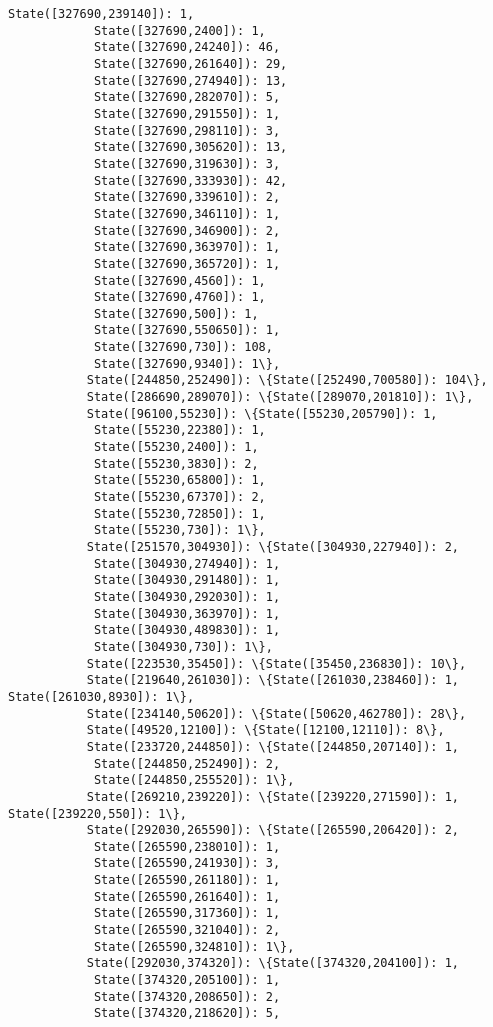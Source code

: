 \documentclass[11pt]{article}
\begin{document}
\begin{Verbatim}[commandchars=\\\{\}]
            State([327690,239140]): 1,
            State([327690,2400]): 1,
            State([327690,24240]): 46,
            State([327690,261640]): 29,
            State([327690,274940]): 13,
            State([327690,282070]): 5,
            State([327690,291550]): 1,
            State([327690,298110]): 3,
            State([327690,305620]): 13,
            State([327690,319630]): 3,
            State([327690,333930]): 42,
            State([327690,339610]): 2,
            State([327690,346110]): 1,
            State([327690,346900]): 2,
            State([327690,363970]): 1,
            State([327690,365720]): 1,
            State([327690,4560]): 1,
            State([327690,4760]): 1,
            State([327690,500]): 1,
            State([327690,550650]): 1,
            State([327690,730]): 108,
            State([327690,9340]): 1\},
           State([244850,252490]): \{State([252490,700580]): 104\},
           State([286690,289070]): \{State([289070,201810]): 1\},
           State([96100,55230]): \{State([55230,205790]): 1,
            State([55230,22380]): 1,
            State([55230,2400]): 1,
            State([55230,3830]): 2,
            State([55230,65800]): 1,
            State([55230,67370]): 2,
            State([55230,72850]): 1,
            State([55230,730]): 1\},
           State([251570,304930]): \{State([304930,227940]): 2,
            State([304930,274940]): 1,
            State([304930,291480]): 1,
            State([304930,292030]): 1,
            State([304930,363970]): 1,
            State([304930,489830]): 1,
            State([304930,730]): 1\},
           State([223530,35450]): \{State([35450,236830]): 10\},
           State([219640,261030]): \{State([261030,238460]): 1, State([261030,8930]): 1\},
           State([234140,50620]): \{State([50620,462780]): 28\},
           State([49520,12100]): \{State([12100,12110]): 8\},
           State([233720,244850]): \{State([244850,207140]): 1,
            State([244850,252490]): 2,
            State([244850,255520]): 1\},
           State([269210,239220]): \{State([239220,271590]): 1, State([239220,550]): 1\},
           State([292030,265590]): \{State([265590,206420]): 2,
            State([265590,238010]): 1,
            State([265590,241930]): 3,
            State([265590,261180]): 1,
            State([265590,261640]): 1,
            State([265590,317360]): 1,
            State([265590,321040]): 2,
            State([265590,324810]): 1\},
           State([292030,374320]): \{State([374320,204100]): 1,
            State([374320,205100]): 1,
            State([374320,208650]): 2,
            State([374320,218620]): 5,

\end{Verbatim}
\end{document}
